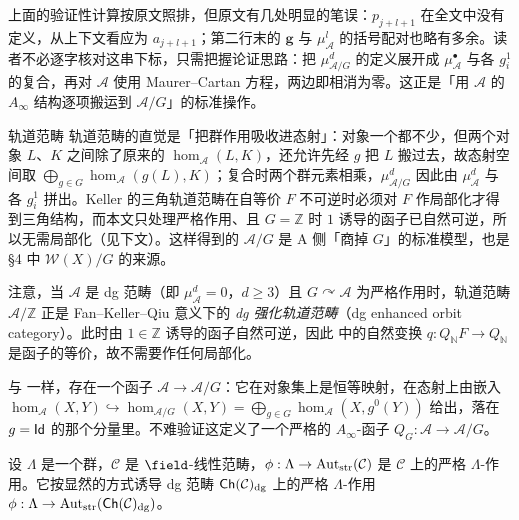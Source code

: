 \begin{yizhu}[证明中的笔误与读法]
上面的验证性计算按原文照排，但原文有几处明显的笔误：$p_{j+l+1}$ 在全文中没有定义，从上下文看应为 $a_{j+l+1}$；第二行末的 $\mathbf{g}$ 与 $\mu^l_{\mathcal{A}}$ 的括号配对也略有多余。读者不必逐字核对这串下标，只需把握论证思路：把 $\mu^d_{\mathcal{A}/G}$ 的定义展开成 $\mu^{\bullet}_{\mathcal{A}}$ 与各 $g_i^1$ 的复合，再对 $\mathcal{A}$ 使用 Maurer--Cartan 方程，两边即相消为零。这正是「用 $\mathcal{A}$ 的 $A_{\infty}$ 结构逐项搬运到 $\mathcal{A}/G$」的标准操作。
\end{yizhu}

\begin{conceptbox}{轨道范畴}
轨道范畴的直觉是「把群作用吸收进态射」：对象一个都不少，但两个对象 $L$、$K$ 之间除了原来的 $\hom_{\mathcal{A}}(L,K)$，还允许先经 $g$ 把 $L$ 搬过去，故态射空间取 $\bigoplus_{g\in G}\hom_{\mathcal{A}}(g(L),K)$；复合时两个群元素相乘，$\mu^d_{\mathcal{A}/G}$ 因此由 $\mu^d_{\mathcal{A}}$ 与各 $g_i^1$ 拼出。Keller 的三角轨道范畴在自等价 $F$ 不可逆时必须对 $F$ 作局部化才得到三角结构，而本文只处理严格作用、且 $G=\mathbb{Z}$ 时 $1$ 诱导的函子已自然可逆，所以无需局部化（见下文）。这样得到的 $\mathcal{A}/G$ 是 A 侧「商掉 $G$」的标准模型，也是 §4 中 $\mathcal{W}(X)/G$ 的来源。
\par\smallskip{}
\end{conceptbox}

注意，当 $\mathcal{A}$ 是 dg 范畴（即 $\mu_{\mathcal{A}}^d=0$，$d\geq 3$）且 $G\curvearrowright\mathcal{A}$ 为严格作用时，轨道范畴 $\mathcal{A}/\mathbb{Z}$ 正是 Fan--Keller--Qiu \cite{FKQ24} 意义下的 \emph{dg 强化轨道范畴}（dg enhanced orbit category）。此时由 $1\in\mathbb{Z}$ 诱导的函子自然可逆，因此 \cite{FKQ24} 中的自然变换 $q\colon Q_{\mathbb{N}}F\to Q_{\mathbb{N}}$ 是函子的等价，故不需要作任何局部化。\par
与 \cite{FKQ24} 一样，存在一个函子 $\mathcal{A}\to\mathcal{A}/G$：它在对象集上是恒等映射，在态射上由嵌入 $\hom_{\mathcal{A}} (X,Y)\hookrightarrow\hom_{\mathcal{A}/G} (X,Y)=\displaystyle\bigoplus_{g\in G}\hom_{\mathcal{A}} (X,g^0(Y))$ 给出，落在 $g=\operatorname{\mathsf{Id}}$ 的那个分量里。不难验证这定义了一个严格的 $A_{\infty}$-函子 $Q_G\colon\mathcal{A}\to\mathcal{A}/G$。
\begin{exmp}
设 $\Lambda$ 是一个群，$\mathcal{C}$ 是 $\field$-线性范畴，$\phi:\Lambda\rightarrow\operatorname{Aut}_{\operatorname{\operatorname{str}}}(\mathcal{C})$ 是 $\mathcal{C}$ 上的严格 $\Lambda$-作用。它按显然的方式诱导 dg 范畴 $\operatorname{\mathsf{Ch}}(\mathcal{C})_{\operatorname{\operatorname{dg}}}$ 上的严格 $\Lambda$-作用 $\phi:\Lambda\rightarrow\operatorname{Aut}_{\operatorname{\operatorname{str}}}(\operatorname{\mathsf{Ch}}(\mathcal{C})_{\operatorname{\operatorname{dg}}})$。
\end{exmp}
